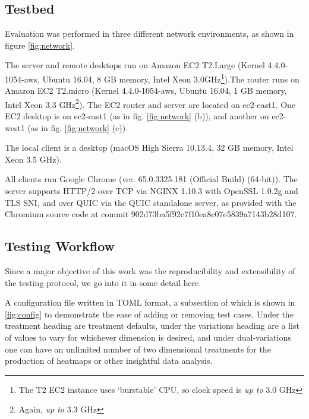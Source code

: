 \documentclass[12pt]{article}
\begin{document}
\subsection{Testbed}
Evaluation was performed in three different network environments, as shown in figure \ref{fig:network}.

The server and remote desktops run on Amazon EC2 T2.Large (Kernel 4.4.0-1054-aws, Ubuntu 16.04, 8 GB memory, Intel Xeon 3.0GHz\footnote{The T2 EC2 instance uses `burstable' CPU, so clock speed is \emph{up to} 3.0 GHz}).The router runs on Amazon EC2 T2.micro (Kernel 4.4.0-1054-aws, Ubuntu 16.04, 1 GB memory, Intel Xeon 3.3 GHz\footnote{Again, \emph{up to} 3.3 GHz}). The EC2 router and server are located on ec2-east1. One EC2 desktop is on ec2-east1 (as in fig. \ref{fig:network} (b)), and another on ec2-west1 (as in fig. \ref{fig:network} (c)).

The local client is a desktop (macOS High Sierra 10.13.4, 32 GB memory, Intel Xeon 3.5 GHz).

All clients run Google Chrome (ver. 65.0.3325.181 (Official Build) (64-bit)). The server supports HTTP/2 over TCP via NGINX 1.10.3 with OpenSSL 1.0.2g and TLS SNI, and over QUIC via the QUIC standalone server, as provided with the Chromium source code at commit 902d73ba5f92c7f10ea8c07e5839a7143b28d107.

\subsection{Testing Workflow}
Since a major objective of this work was the reproducibility and extensibility of the testing protocol, we go into it in some detail here.

A configuration file written in TOML format, a subsection of which is shown in \ref{fig:config} to demonstrate the ease of adding or removing test cases. Under the treatment heading are treatment defaults, under the variations heading are a list of values to vary for whichever dimension is desired, and under dual-variations one can have an unlimited number of two dimensional treatments for the production of heatmaps or other insightful data analysis.
\end{document}

